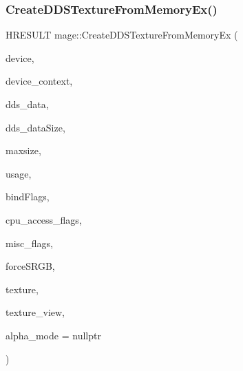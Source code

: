 \subsubsection{\texorpdfstring{Create\+D\+D\+S\+Texture\+From\+Memory\+Ex()}{CreateDDSTextureFromMemoryEx()}\hspace{0.1cm}{\footnotesize\ttfamily [2/4]}}
{\footnotesize\ttfamily H\+R\+E\+S\+U\+LT mage\+::\+Create\+D\+D\+S\+Texture\+From\+Memory\+Ex (\begin{DoxyParamCaption}\item[{\+\_\+\+In\+\_\+ I\+D3\+D11\+Device2 $\ast$}]{device,  }\item[{\+\_\+\+In\+\_\+opt\+\_\+ I\+D3\+D11\+Device\+Context $\ast$}]{device\+\_\+context,  }\item[{\+\_\+\+In\+\_\+reads\+\_\+bytes\+\_\+(dds\+\_\+data\+Size) const uint8\+\_\+t $\ast$}]{dds\+\_\+data,  }\item[{\+\_\+\+In\+\_\+ size\+\_\+t}]{dds\+\_\+data\+Size,  }\item[{\+\_\+\+In\+\_\+ size\+\_\+t}]{maxsize,  }\item[{\+\_\+\+In\+\_\+ D3\+D11\+\_\+\+U\+S\+A\+GE}]{usage,  }\item[{\+\_\+\+In\+\_\+ uint32\+\_\+t}]{bind\+Flags,  }\item[{\+\_\+\+In\+\_\+ uint32\+\_\+t}]{cpu\+\_\+access\+\_\+flags,  }\item[{\+\_\+\+In\+\_\+ uint32\+\_\+t}]{misc\+\_\+flags,  }\item[{\+\_\+\+In\+\_\+ bool}]{force\+S\+R\+GB,  }\item[{\+\_\+\+Outptr\+\_\+opt\+\_\+ I\+D3\+D11\+Resource $\ast$$\ast$}]{texture,  }\item[{\+\_\+\+Outptr\+\_\+opt\+\_\+ I\+D3\+D11\+Shader\+Resource\+View $\ast$$\ast$}]{texture\+\_\+view,  }\item[{\+\_\+\+Out\+\_\+opt\+\_\+ \hyperlink{namespacemage_a0c586a2bad862f4858900ca121ca80c2}{D\+D\+S\+\_\+\+A\+L\+P\+H\+A\+\_\+\+M\+O\+DE} $\ast$}]{alpha\+\_\+mode = {\ttfamily nullptr} }\end{DoxyParamCaption})}

\hypertarget{namespacemage_ad29f0d5028acb22c5f5e1a333e6a622b}{}\label{namespacemage_ad29f0d5028acb22c5f5e1a333e6a622b} 
